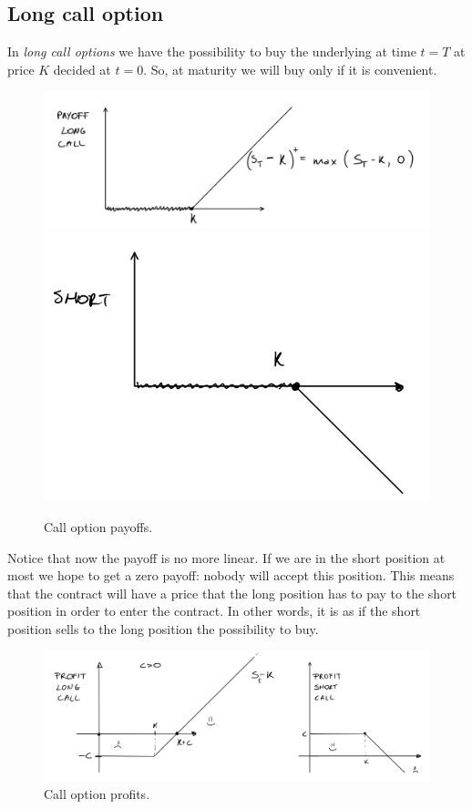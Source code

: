 \subsection{Long call option}
In \emph{long call options} we have the possibility to buy the underlying at time $t=T$ at price $K$ decided at $t=0$. So, at maturity we will buy only if it is convenient.
\begin{figure}[h]
    \centering
    \includegraphics[scale=0.2]{fig/tmp/fig1a}
    \includegraphics[scale=0.2]{fig/tmp/fig1b}
    \caption{Call option payoffs.}
    \label{fig:figura1}
\end{figure}
\newline Notice that now the payoff is no more linear. If we are in the short position at most we hope to get a zero payoff: nobody will accept this position. This means that the contract will have a price that the long position has to pay to the short position in order to enter the contract. In other words, it is as if the short position sells to the long position the possibility to buy.
\begin{figure}[h]
    \centering
    \includegraphics[scale=0.2]{fig/tmp/fig2}
    \caption{Call option profits.}
    \label{fig:figura2}
\end{figure}
